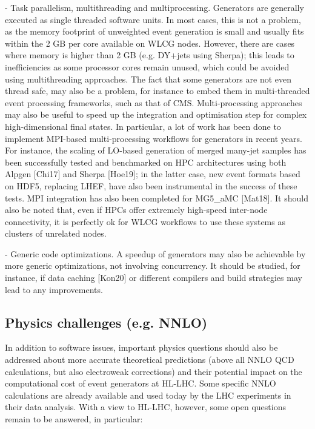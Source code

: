 \documentclass[11pt,a4paper]{article}
\begin{document}
- {Task parallelism, multithreading and multiprocessing}. Generators are
generally executed as single threaded software units. In most cases,
this is not a problem, as the memory footprint of unweighted event
generation is small and usually fits within the 2 GB per core available
on WLCG nodes. However, there are cases where memory is higher than 2 GB
(e.g. DY+jets using Sherpa); this leads to inefficiencies as some
processor cores remain unused, which could be avoided using
multithreading approaches. The fact that some generators are not even
thread safe, may also be a problem, for instance to embed them in
multi-threaded event processing frameworks, such as that of CMS.
Multi-processing approaches may also be useful to speed up the
integration and optimisation step for complex high-dimensional final
states. In particular, a lot of work has been done to implement
MPI-based multi-processing workflows for generators in recent years. For
instance, the scaling of LO-based generation of merged many-jet samples
has been successfully tested and benchmarked on HPC architectures using
both Alpgen {[}Chi17{]} and Sherpa {[}Hoe19{]}; in the latter case, new
event formats based on HDF5, replacing LHEF, have also been instrumental
in the success of these tests. MPI integration has also been completed
for MG5\_aMC {[}Mat18{]}. It should also be noted that, even if HPCs
offer extremely high-speed inter-node connectivity, it is perfectly ok
for WLCG workflows to use these systems as clusters of unrelated nodes.

- {Generic code optimizations}. A speedup of generators may also be
achievable by more generic optimizations, not involving concurrency. It
should be studied, for instance, if data caching {[}Kon20{]} or
different compilers and build strategies may lead to any improvements.

\hypertarget{physics-challenges-e.g.-nnlo}{%
\subsection{Physics challenges (e.g.
NNLO)}\label{physics-challenges-e.g.-nnlo}}

In addition to software issues, important physics questions should also
be addressed about more accurate theoretical predictions (above all NNLO
QCD calculations, but also electroweak corrections) and their potential
impact on the computational cost of event generators at HL-LHC. Some
specific NNLO calculations are already available and used today by the
LHC experiments in their data analysis. With a view to HL-LHC, however,
some open questions remain to be answered, in particular:
\end{document}
